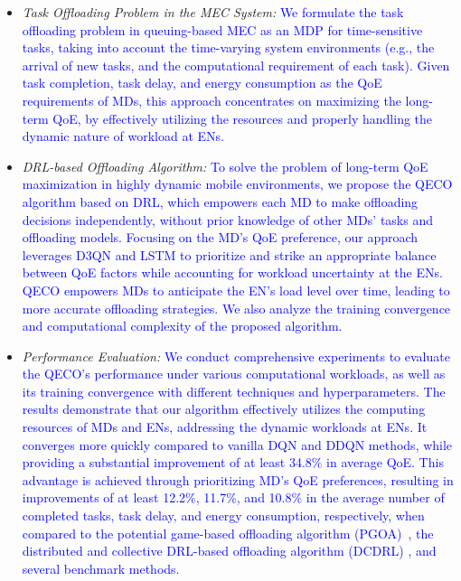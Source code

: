 \documentclass[12pt,draftclsnofoot,onecolumn]{IEEEtran}
\begin{document}
\begin{itemize}
	\item \textit{Task Offloading Problem in the MEC System:} \textcolor{blue}{ We formulate the task offloading problem in queuing-based MEC as an MDP for time-sensitive tasks, taking into account the time-varying system environments (e.g., the arrival of new tasks, and the computational requirement of each task). Given task completion, task delay, and energy consumption as the QoE requirements of MDs, this approach concentrates on maximizing the long-term QoE, by effectively utilizing the resources and properly handling the dynamic nature of workload at ENs.}
	
	
	
	\item \textit{DRL-based Offloading Algorithm:} \textcolor{blue}{To solve the problem of long-term QoE maximization in highly dynamic mobile environments, we propose the QECO algorithm based on DRL, which empowers each MD to make offloading decisions independently, without prior knowledge of other MDs' tasks and offloading models. Focusing on the MD's QoE preference, our approach leverages D3QN and LSTM to prioritize and strike an appropriate balance between QoE factors while accounting for workload uncertainty at the ENs. QECO empowers MDs to anticipate the EN's load level over time, leading to more accurate offloading strategies. We also analyze the training convergence and computational complexity of the proposed algorithm.}
	
	\item \textit{Performance Evaluation:} \textcolor{blue}{We conduct comprehensive experiments to evaluate the QECO's performance under various computational workloads, as well as its training convergence with different techniques and hyperparameters. The results demonstrate that our algorithm effectively utilizes the computing resources of MDs and ENs, addressing the dynamic workloads at ENs. It converges more quickly compared to vanilla DQN and DDQN methods, while providing a substantial improvement of at least 34.8\% in average QoE. This advantage is achieved through prioritizing MD's QoE preferences, resulting in improvements of at least 12.2\%, 11.7\%, and 10.8\% in the average number of completed tasks, task delay, and energy consumption, respectively, when compared to the potential game-based offloading algorithm (PGOA)~\cite{yang2018distributed}, the distributed and collective DRL-based offloading algorithm (DCDRL) \cite{qiu2020distributed}, and several benchmark methods.}
	
	
	
\end{itemize}
\end{document}

